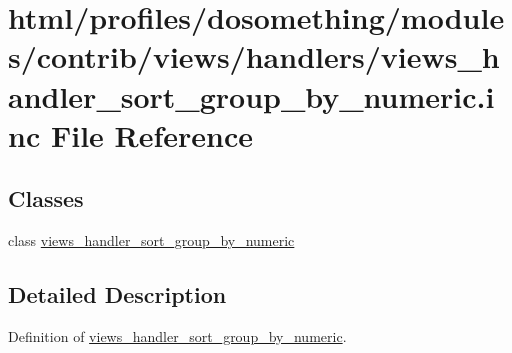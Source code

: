 \hypertarget{views__handler__sort__group__by__numeric_8inc}{
\section{html/profiles/dosomething/modules/contrib/views/handlers/views\_\-handler\_\-sort\_\-group\_\-by\_\-numeric.inc File Reference}
\label{views__handler__sort__group__by__numeric_8inc}
}
\subsection*{Classes}
\begin{DoxyCompactItemize}
\item 
class \hyperlink{classviews__handler__sort__group__by__numeric}{views\_\-handler\_\-sort\_\-group\_\-by\_\-numeric}
\end{DoxyCompactItemize}


\subsection{Detailed Description}
Definition of \hyperlink{classviews__handler__sort__group__by__numeric}{views\_\-handler\_\-sort\_\-group\_\-by\_\-numeric}. 